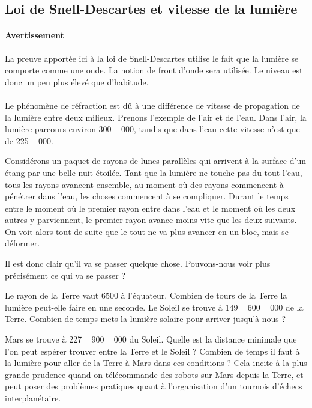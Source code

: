 

\subsection{Loi de Snell-Descartes et vitesse de la lumière}   \label{SubsecSnellVitesse}

\paragraph{Avertissement}
La preuve apportée ici à la loi de Snell-Descartes utilise le fait que la lumière se comporte comme une onde. La notion de front d'onde sera utilisée. Le niveau est donc un peu plus élevé que d'habitude.

\paragraph{}

Le phénomène de réfraction est dû à une différence de vitesse de propagation de la lumière entre deux milieux. Prenons l'exemple de l'air et de l'eau. Dans l'air, la lumière parcours environ \unit{300\,000}{\kilo\meter\per\second}, tandis que dans l'eau cette vitesse n'est que de \unit{225\,000}{\kilo\meter\per\second}. 

Considérons un paquet de rayons de lunes parallèles qui arrivent à la surface d'un étang par une belle nuit étoilée. Tant que la lumière ne touche pas du tout l'eau, tous les rayons avancent ensemble, au moment où des rayons commencent à pénétrer dans l'eau, les choses commencent à se compliquer. Durant le temps entre le moment où le premier rayon entre dans l'eau et le moment où les deux autres y parviennent, le premier rayon avance moins vite que les deux suivants. On voit alors tout de suite que le tout ne va plus avancer en un bloc, mais se déformer.

Il est donc clair qu'il va se passer quelque chose. Pouvons-nous voir plus précisément ce qui va se passer ?

\begin{exercice}
Le rayon de la Terre vaut \unit{6500}{\kilo\meter} à l'équateur. Combien de tours de la Terre la lumière peut-elle faire en une seconde. Le Soleil se trouve à \unit{149\,600\,000}{\kilo\meter} de la Terre. Combien de temps mets la lumière solaire pour arriver jusqu'à nous ? 

Mars se trouve à \unit{227\,900\,000}{\kilo\meter} du Soleil. Quelle est la distance minimale que l'on peut espérer trouver entre la Terre et le Soleil ? Combien de temps il faut à la lumière pour aller de la Terre à Mars dans ces conditions ? Cela incite à la plus grande prudence quand on télécommande des robots sur Mars depuis la Terre, et peut poser des problèmes pratiques quant à l'organisation d'un tournois d'échecs interplanétaire.
\end{exercice}


